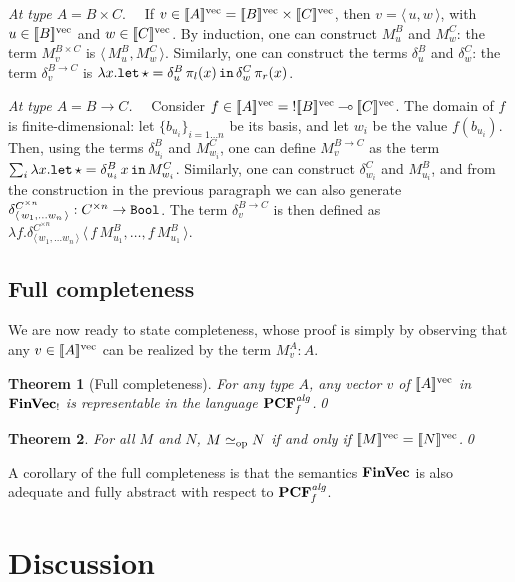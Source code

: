 \documentclass[10pt]{article}
\theoremstyle{plain}
\newtheorem{theorem}{Theorem}
\theoremstyle{definition}
\newcommand{\loli}{\mathbin{\multimap}}
\newcommand{\FinVec}{\mbox{\bf FinVec}}
\newcommand{\pair}[1]{{\langle\,{#1}\,\rangle}}
\newcommand{\letunit}[2]{{\tt let}\,\star={#1}\,{\tt in}\,{#2}}
\newcommand{\bit}{{\tt Bool}}
\newcommand{\opeq}{\mathrel{\simeq_{\rm op}}}
\newcommand{\fvdenot}[1]{{[\![{#1}]\!]^{\rm vec}}}
\begin{document}
\smallskip
\noindent
{\em At type $A=B\times C$}.~~
If
$v\in\fvdenot{A}={\fvdenot{B}}\times{\fvdenot{C}}$, then $v =
\pair{u,w}$, with $u\in\fvdenot{B}$ and $w\in\fvdenot{C}$. 
By induction, one can construct $M^B_{u}$ and $M^C_{w}$: the term
$M^{B\times C}_v$ is $\pair{M^B_{u},M^C_{w}}$. Similarly, one can construct the terms
$\delta^B_u$ and $\delta^C_w$: the term $\delta^{B\to C}_v$ is 
$
\lambda x.\letunit{\delta^B_u\,\pi_l(x)}{\delta^C_w\,\pi_r(x)}$.

\smallskip
\noindent
{\em At type $A=B\to C$.}~~
Consider
$f\in\fvdenot{A}={!\fvdenot{B}}\loli\fvdenot{C}$. The domain of $f$
is finite-dimensional: let $\{b_{u_i}\}_{i=1\ldots n}$ be its basis, and let $w_i$
be the value $f(b_{u_i})$. Then, using the terms $\delta^B_{u_i}$ and
$M^C_{w_i}$, one can define $M^{B\to C}_v$ as the term
$
\sum_i\lambda x.\letunit{\delta^{B}_{u_i}\,x}{M^{C}_{w_i}}
$.
Similarly, one can construct $\delta^C_{w_i}$ and $M^B_{u_i}$, and from
the construction in the previous paragraph we can also generate
$\delta^{C^{\times n}}_{\pair{w_1,\ldots w_n}}:C^{\times n}\to\bit$. The term
$\delta^{B\to C}_v$ is then defined as
$
\lambda f.\delta^{C^{\times n}}_{\pair{w_1,\ldots w_n}}\,\pair{f\,M^B_{u_1},\ldots,f\,M^B_{u_1}}.
$

\subsection{Full completeness}

We are now ready to state completeness, whose proof is simply by
observing that any $v\in\fvdenot{A}$ can be realized by the term $M^A_v:A$.

\begin{theorem}[Full completeness]
  \label{th:comp-alg}
  For any type $A$, any vector $v$ of $\fvdenot{A}$ in $\FinVec_!$ is
  representable in the language ${\bf PCF}_{\it f}^{\it alg}$.\qed
\end{theorem}


\begin{theorem}
  \label{th:eq-alg}
  For all $M$ and $N$, $M\opeq N$ if and only if
  $\fvdenot{M}=\fvdenot{N}$.\qed
\end{theorem}

A corollary of the full completeness is that the semantics $\FinVec$ is also adequate
and fully abstract with respect to ${\bf PCF}_{\it f}^{\it alg}$.


\section{Discussion}
\label{sec:discussion}
\end{document}
